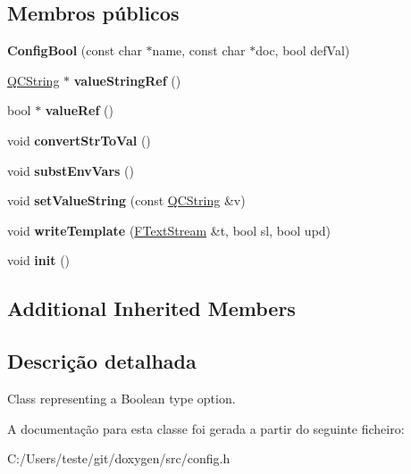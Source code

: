 \subsection*{Membros públicos}
\begin{DoxyCompactItemize}
\item 
\hypertarget{class_config_bool_a3928df38242af64dde3e892e625f7e50}{{\bfseries Config\-Bool} (const char $\ast$name, const char $\ast$doc, bool def\-Val)}\label{class_config_bool_a3928df38242af64dde3e892e625f7e50}

\item 
\hypertarget{class_config_bool_a0c7ffe0fff991390d97a629f692a5854}{\hyperlink{class_q_c_string}{Q\-C\-String} $\ast$ {\bfseries value\-String\-Ref} ()}\label{class_config_bool_a0c7ffe0fff991390d97a629f692a5854}

\item 
\hypertarget{class_config_bool_a98f536bae72d94284a2d6edcbb2a1d49}{bool $\ast$ {\bfseries value\-Ref} ()}\label{class_config_bool_a98f536bae72d94284a2d6edcbb2a1d49}

\item 
\hypertarget{class_config_bool_adf2580bb1cb265aed049fd1553c658c2}{void {\bfseries convert\-Str\-To\-Val} ()}\label{class_config_bool_adf2580bb1cb265aed049fd1553c658c2}

\item 
\hypertarget{class_config_bool_a79866440425087f224d4f77311efad6a}{void {\bfseries subst\-Env\-Vars} ()}\label{class_config_bool_a79866440425087f224d4f77311efad6a}

\item 
\hypertarget{class_config_bool_ab42f4a444d994a5186f3f1c77c5444ad}{void {\bfseries set\-Value\-String} (const \hyperlink{class_q_c_string}{Q\-C\-String} \&v)}\label{class_config_bool_ab42f4a444d994a5186f3f1c77c5444ad}

\item 
\hypertarget{class_config_bool_a4972a64bbfa8f975c5704239e71c4811}{void {\bfseries write\-Template} (\hyperlink{class_f_text_stream}{F\-Text\-Stream} \&t, bool sl, bool upd)}\label{class_config_bool_a4972a64bbfa8f975c5704239e71c4811}

\item 
\hypertarget{class_config_bool_a02fd73d861ef2e4aabb38c0c9ff82947}{void {\bfseries init} ()}\label{class_config_bool_a02fd73d861ef2e4aabb38c0c9ff82947}

\end{DoxyCompactItemize}
\subsection*{Additional Inherited Members}


\subsection{Descrição detalhada}
Class representing a Boolean type option. 

A documentação para esta classe foi gerada a partir do seguinte ficheiro\-:\begin{DoxyCompactItemize}
\item 
C\-:/\-Users/teste/git/doxygen/src/config.\-h\end{DoxyCompactItemize}
